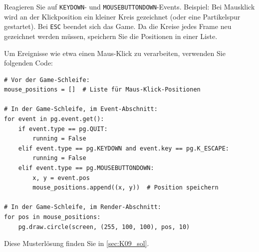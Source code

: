 \begin{myexercise}\label{myexercise:Ereignisse}
    Reagieren Sie auf \lstinline|KEYDOWN|- und \lstinline|MOUSEBUTTONDOWN|-Events. Beispiel: Bei Mausklick wird an der Klickposition ein kleiner Kreis gezeichnet (oder eine Partikelspur gestartet). Bei \lstinline|ESC| beendet sich das Game. Da die Kreise jedes Frame neu gezeichnet werden müssen, speichern Sie die Positionen in einer Liste.

    Um Ereignisse wie etwa einen Maus-Klick zu verarbeiten, verwenden Sie folgenden Code:
    \begin{lstlisting}
# Vor der Game-Schleife:
mouse_positions = []  # Liste für Maus-Klick-Positionen

# In der Game-Schleife, im Event-Abschnitt:
for event in pg.event.get():
	if event.type == pg.QUIT:
		running = False
	elif event.type == pg.KEYDOWN and event.key == pg.K_ESCAPE:
		running = False
	elif event.type == pg.MOUSEBUTTONDOWN:
		x, y = event.pos
        mouse_positions.append((x, y))  # Position speichern

# In der Game-Schleife, im Render-Abschnitt:
for pos in mouse_positions:
    pg.draw.circle(screen, (255, 100, 100), pos, 10)
\end{lstlisting}
	\begin{myanswer}
		Diese Musterlösung finden Sie in \cref{sec:K09_sol}.
	\end{myanswer}
\end{myexercise}

